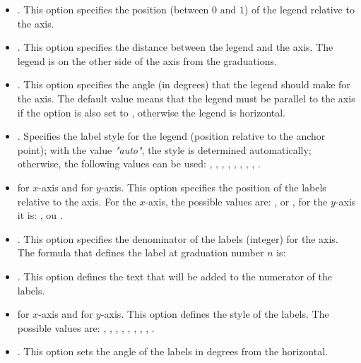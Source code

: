 \begin{itemize}
\begin{itemize}
        \item {}. This option specifies the position (between $0$ and $1$) of the legend relative to the axis.

        \item {}. This option specifies the distance between the legend and the axis. The legend is on the other side of the axis from the graduations.

        \item {}. This option specifies the angle (in degrees) that the legend should make for the axis. The default value  means that the legend must be parallel to the axis if the  option is also set to , otherwise the legend is horizontal.

        \item {}. Specifies the label style for the legend (position relative to the anchor point); with the value \emph{"auto"}, the style is determined automatically; otherwise, the following values ​​can be used:  , , , , , , , , .

        \item {} for $x$-axis and  for $y$-axis. This option specifies the position of the labels relative to the axis. For the $x$-axis, the possible values ​​are: ,  or , for the $y$-axis it is:  ,  ou .

        \item {}. This option specifies the denominator of the labels (integer) for the axis. The formula that defines the label at graduation number $n$ is: 

        \item {}. This option defines the text that will be added to the numerator of the labels.

        \item {} for $x$-axis and  for $y$-axis. This option defines the style of the labels. The possible values ​​are: , , , , , , , , .

        \item {}. This option sets the angle of the labels in degrees from the horizontal.


\end{itemize}
\end{itemize}
